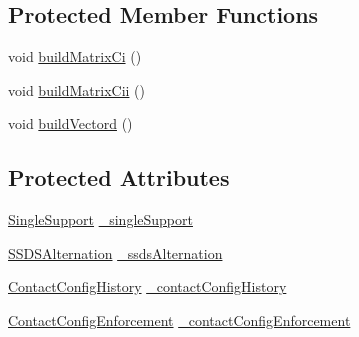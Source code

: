 \subsection*{\-Protected \-Member \-Functions}
\begin{DoxyCompactItemize}
\item 
void \hyperlink{classAdmissibilityConstraints_a22333fbffb9df28433e066b5a00a9c00}{build\-Matrix\-Ci} ()
\item 
void \hyperlink{classAdmissibilityConstraints_a98de6682160b1161d0eb57852ccfce25}{build\-Matrix\-Cii} ()
\item 
void \hyperlink{classAdmissibilityConstraints_a48f89a09f8c9607925652622a8c70fb4}{build\-Vectord} ()
\end{DoxyCompactItemize}
\subsection*{\-Protected \-Attributes}
\begin{DoxyCompactItemize}
\item 
\hyperlink{classSingleSupport}{\-Single\-Support} \hyperlink{classAdmissibilityConstraints_aee4eb816d53a047667da3a7a1f1cac7a}{\-\_\-single\-Support}
\item 
\hyperlink{classSSDSAlternation}{\-S\-S\-D\-S\-Alternation} \hyperlink{classAdmissibilityConstraints_a250631ea82f9c5f88a785537f9e1e9a4}{\-\_\-ssds\-Alternation}
\item 
\hyperlink{classContactConfigHistory}{\-Contact\-Config\-History} \hyperlink{classAdmissibilityConstraints_af2e1d259480686b009077f0c20892bef}{\-\_\-contact\-Config\-History}
\item 
\hyperlink{classContactConfigEnforcement}{\-Contact\-Config\-Enforcement} \hyperlink{classAdmissibilityConstraints_af782db54a141b07c490f726187e2ca8e}{\-\_\-contact\-Config\-Enforcement}
\end{DoxyCompactItemize}


